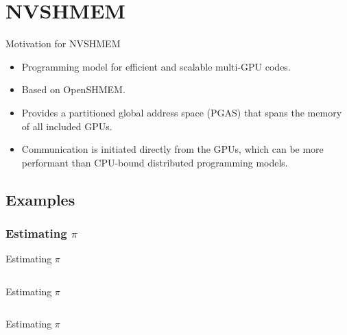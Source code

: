 \section{NVSHMEM}

\begin{frame}{Motivation for NVSHMEM}
\begin{itemize}
\item Programming model for efficient and scalable multi-GPU codes.
\item Based on OpenSHMEM.
\item Provides a partitioned global address space (PGAS) that spans the memory
      of all included GPUs.
\item Communication is initiated directly from the GPUs, which can be more
      performant than CPU-bound distributed programming models.
\end{itemize}
\end{frame}

\subsection{Examples}
\subsubsection{Estimating \(\pi\)}

\begin{frame}{Estimating \(\pi\)}
\begin{listing}[H]
\inputminted[firstline=1, lastline=14]{C++}{examples/nvshmem/nvshmem_pi.cpp}
\caption{Includes and definitions.}
\end{listing}
\end{frame}

\begin{frame}{Estimating \(\pi\)}
\begin{listing}[H]
\inputminted[firstline=16, lastline=32]{C++}{examples/nvshmem/nvshmem_pi.cpp}
\caption{Monte Carlo method for estimating \(\pi\) CUDA kernel.}
\end{listing}
\end{frame}

\begin{frame}{Estimating \(\pi\)}
\begin{listing}[H]
\inputminted[firstline=35, lastline=45]{C++}{examples/nvshmem/nvshmem_pi.cpp}
\caption{Initialize NVSHMEM and get local processing element (PE) ID and global number of PEs.}
\end{listing}
\end{frame}

